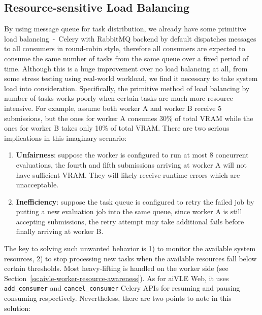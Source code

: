 \subsection{Resource-sensitive Load Balancing}
\label{ss:aivle-web-load-balancing}
By using message queue for task distribution, we already have some primitive load balancing~-~Celery with RabbitMQ backend by default dispatches messages to all consumers in round-robin style, therefore all consumers are expected to consume the same number of tasks from the same queue over a fixed period of time. Although this is a huge improvement over no load balancing at all, from some stress testing using real-world workload, we find it necessary to take system load into consideration. Specifically, the primitive method of load balancing by number of tasks works poorly when certain tasks are much more resource intensive. For example, assume both worker A and worker B receive 5 submissions, but the ones for worker A consumes 30\% of total VRAM while the ones for worker B takes only 10\% of total VRAM. There are two serious implications in this imaginary scenario:
\begin{enumerate}
    \item \textbf{Unfairness}: suppose the worker is configured to run at most 8 concurrent evaluations, the fourth and fifth submissions arriving at worker A will not have sufficient VRAM. They will likely receive runtime errors which are unacceptable.
    \item \textbf{Inefficiency}: suppose the task queue is configured to retry the failed job by putting a new evaluation job into the same queue, since worker A is still accepting submissions, the retry attempt may take additional fails before finally arriving at worker B.
\end{enumerate}

The key to solving such unwanted behavior is 1) to monitor the available system resources, 2) to stop processing new tasks when the available resources fall below certain thresholds. Most heavy-lifting is handled on the worker side (see Section~\ref{ss:aivle-worker-resource-awareness}). As for aiVLE Web, it uses \texttt{add\_consumer} and \texttt{cancel\_consumer} Celery APIs for resuming and pausing consuming respectively. Nevertheless, there are two points to note in this solution:

